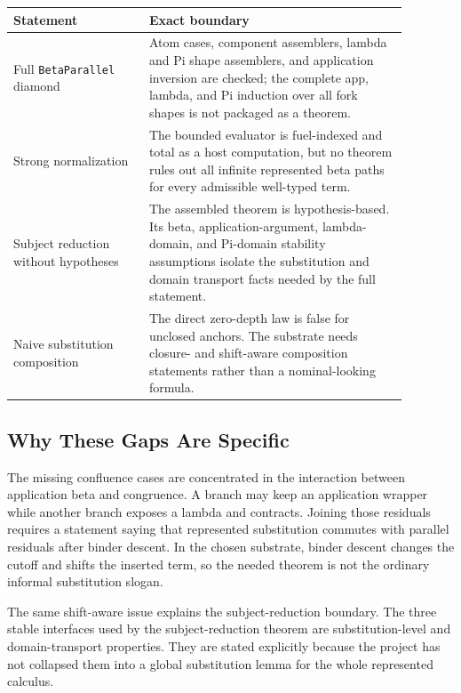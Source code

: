 \begin{center}
\begin{tabular}{p{0.30\linewidth}p{0.58\linewidth}}
\hline
Statement & Exact boundary \\
\hline
Full \texttt{BetaParallel} diamond &
Atom cases, component assemblers, lambda and Pi shape assemblers, and
application inversion are checked; the complete app, lambda, and Pi induction
over all fork shapes is not packaged as a theorem. \\
Strong normalization &
The bounded evaluator is fuel-indexed and total as a host computation, but no
theorem rules out all infinite represented beta paths for every admissible
well-typed term. \\
Subject reduction without hypotheses &
The assembled theorem is hypothesis-based. Its beta, application-argument,
lambda-domain, and Pi-domain stability assumptions isolate the substitution
and domain transport facts needed by the full statement. \\
Naive substitution composition &
The direct zero-depth law is false for unclosed anchors. The substrate needs
closure- and shift-aware composition statements rather than a nominal-looking
formula. \\
\hline
\end{tabular}
\end{center}

\subsection{Why These Gaps Are Specific}
\label{subsec:metatheory-roadmap-gap-reasons}

The missing confluence cases are concentrated in the interaction between
application beta and congruence. A branch may keep an application wrapper while
another branch exposes a lambda and contracts. Joining those residuals requires
a statement saying that represented substitution commutes with parallel
residuals after binder descent. In the chosen substrate, binder descent changes
the cutoff and shifts the inserted term, so the needed theorem is not the
ordinary informal substitution slogan.

The same shift-aware issue explains the subject-reduction boundary. The three
stable interfaces used by the subject-reduction theorem are substitution-level
and domain-transport properties. They are stated explicitly because the
project has not collapsed them into a global substitution lemma for the whole
represented calculus.

